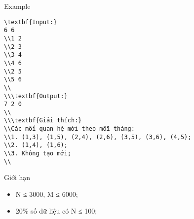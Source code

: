 Example
\begin{verbatim}
\textbf{Input:}
6 6
\\1 2
\\2 3
\\3 4
\\4 6
\\2 5
\\5 6
\\
\\\textbf{Output:}
7 2 0
\\
\\\textbf{Giải thích:}
\\Các mối quan hệ mới theo mỗi tháng:
\\1. (1,3), (1,5), (2,4), (2,6), (3,5), (3,6), (4,5);
\\2. (1,4), (1,6);
\\3. Không tạo mới;
\\\end{verbatim}
Giới hạn
\begin{itemize}
	\item     N ≤ 3000, M ≤ 6000;   
	\item     20\% số dữ liệu có N ≤ 100;   
\end{itemize}